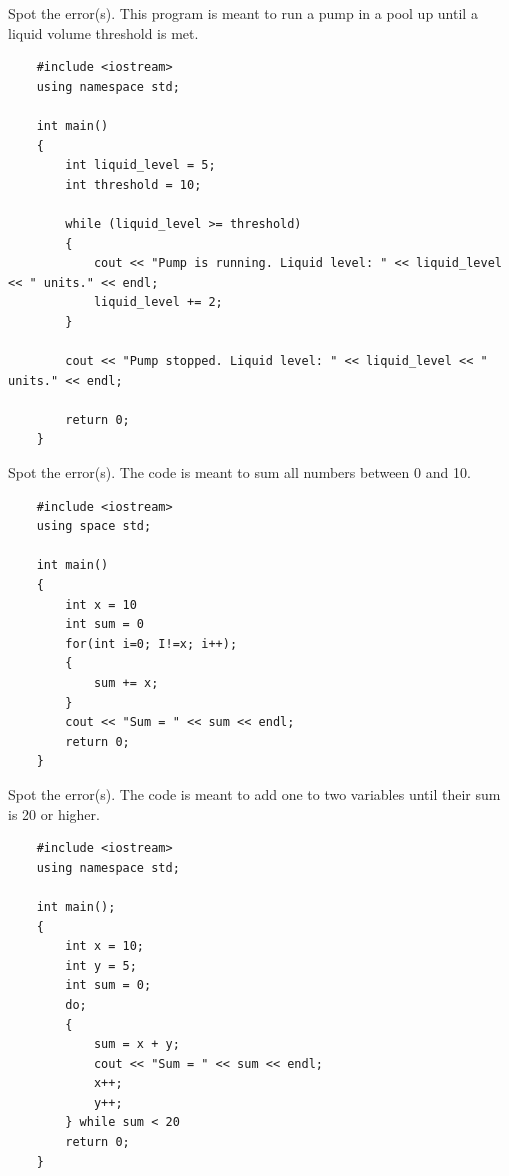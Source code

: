\begin{problem}
    Spot the error(s). This program is meant to run a pump in a pool up until a liquid volume threshold is met.
    \begin{verbatim}
    #include <iostream>
    using namespace std;
    
    int main()
    {
        int liquid_level = 5;
        int threshold = 10;
    
        while (liquid_level >= threshold)
        {
            cout << "Pump is running. Liquid level: " << liquid_level << " units." << endl;
            liquid_level += 2; 
        }
    
        cout << "Pump stopped. Liquid level: " << liquid_level << " units." << endl;
    
        return 0;
    }
    \end{verbatim}
\end{problem}

\begin{problem}
    Spot the error(s). The code is meant to sum all numbers between 0 and 10. 
    \begin{verbatim}
    #include <iostream>
    using space std;
    
    int main()
    {
        int x = 10
        int sum = 0
        for(int i=0; I!=x; i++);
        {
            sum += x;
        }
        cout << "Sum = " << sum << endl;
        return 0;
    }
    \end{verbatim}
\end{problem}

\begin{problem}
    Spot the error(s). The code is meant to add one to two variables until their sum is 20 or higher.
    \begin{verbatim}
    #include <iostream>
    using namespace std;
    
    int main();
    {
        int x = 10;
        int y = 5;
        int sum = 0;
        do; 
        {
            sum = x + y;
            cout << "Sum = " << sum << endl;
            x++;
            y++;
        } while sum < 20
        return 0;
    }
    \end{verbatim}
\end{problem}

